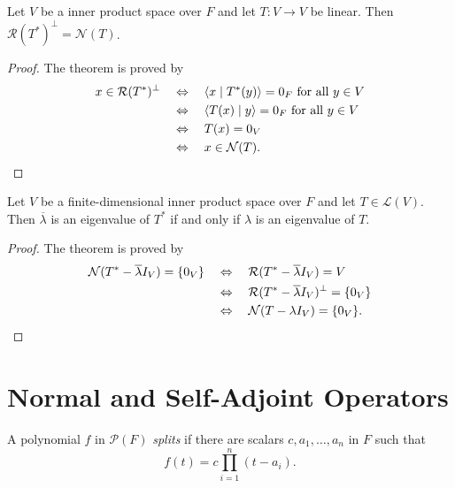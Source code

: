 \begin{theorem}
  Let $V$ be a inner product space over $F$ and let $T: V \to V$ be linear.
  Then $\mathcal{R}(T^*)^\perp = \mathcal{N}(T)$.
\end{theorem}
\begin{proof}
  The theorem is proved by
  \begin{align*}
    x \in \mathcal{R}(T^*)^\perp
    \quad &\Leftrightarrow \quad
    \text{$\left\langle x \; \middle| \; T^*(y) \right\rangle = 0_F$ for all $y \in V$} \\
    \quad &\Leftrightarrow \quad
    \text{$\left\langle T(x) \; \middle| \; y \right\rangle = 0_F$ for all $y \in V$} \\
    \quad &\Leftrightarrow \quad
    T(x) = 0_V \\
    \quad &\Leftrightarrow \quad
    x \in \mathcal{N}(T).
    \qedhere
  \end{align*}
\end{proof}

\begin{theorem}
  \label{thm:adjoint-eigenvalue}
  Let $V$ be a finite-dimensional inner product space over $F$ and let
  $T \in \mathcal{L}(V)$.
  Then $\overline{\lambda}$ is an eigenvalue of $T^*$ if and only if $\lambda$
  is an eigenvalue of $T$.
\end{theorem}
\begin{proof}
  The theorem is proved by
  \begin{align*}
    \mathcal{N}(T^* - \overline{\lambda}I_V) = \{0_V\}
    \quad &\Leftrightarrow \quad
    \mathcal{R}(T^* - \overline{\lambda}I_V) = V \\
    \quad &\Leftrightarrow \quad
    \mathcal{R}(T^* - \overline{\lambda}I_V)^\perp = \{0_V\} \\
    \quad &\Leftrightarrow \quad
    \mathcal{N}(T - \lambda I_V) = \{0_V\}.
    \qedhere
  \end{align*}
\end{proof}

\section{Normal and Self-Adjoint Operators}
\begin{definition}
  A polynomial $f$ in $\mathcal{P}(F)$ \emph{splits} if there are
  scalars $c, a_1, \dots, a_n$ in $F$ such that
  \begin{equation*}
    f(t) = c\prod_{i=1}^n (t - a_i).
  \end{equation*}
\end{definition}

